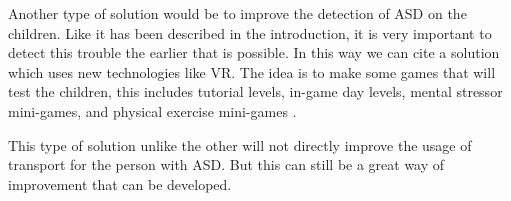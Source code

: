Another type of solution would be to improve the detection of ASD on the children. Like it has been described in the introduction, it is very important to detect this trouble the earlier that is possible. In this way we can cite a solution which uses new technologies like VR. The idea is to make some games that will test the children, this includes tutorial levels, in-game day levels, mental stressor mini-games, and physical exercise mini-games \cite{2021DesigningSmartVirtual}.

This type of solution unlike the other will not directly improve the usage of transport for the person with ASD. But this can still be a great way of improvement that can be developed. 
